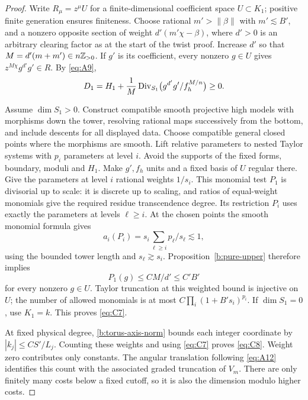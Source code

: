 \begin{proof}
Write \(R_\mu=z^\mu U\) for a finite-dimensional coefficient
space \(U\subset K_1\); positive finite generation ensures
finiteness. Choose rational \(m'>\|\beta\|\) with
\(m'\lesssim B'\), and a nonzero opposite section of weight
\(d'(m'\chi-\beta)\), where \(d'>0\) is an arbitrary
clearing factor as at the start of the twist proof.
Increase \(d'\) so that \(M=d'(m+m')\in n\mathbb Z_{>0}\).
If \(g'\) is its coefficient, every nonzero \(g\in U\) gives
\(z^{M\chi}g^{d'}g'\in R\). By \eqref{eq:A9},
\[
 D_1=H_1+\frac1M\operatorname{Div}_{S_1}
                    \bigl(g^{d'}g'/f_h^{M/n}\bigr)\ge0.
\]

Assume \(\dim S_1>0\). Construct compatible smooth projective
high models with morphisms down the tower, resolving rational
maps successively from the bottom, and include descents for
all displayed data. Choose compatible general closed points
where the morphisms are smooth. Lift relative parameters to
nested Taylor systems with \(p_i\) parameters at level \(i\).
Avoid the supports of the fixed forms, boundary, moduli and
\(H_1\). Make \(g',f_h\) units and a fixed basis of \(U\)
regular there. Give the parameters at level \(i\) rational
weights \(1/s_i\). This monomial test \(P_1\) is divisorial
up to scale: it is discrete up to scaling, and ratios of
equal-weight monomials give the required residue
transcendence degree. Its restriction \(P_i\) uses exactly
the parameters at levels \(\ell\ge i\).
At the chosen points the smooth monomial formula gives
\[
                  a_i(P_i)=s_i\sum_{\ell\ge i}p_\ell/s_\ell
                                      \lesssim1,
\]
using the bounded tower length and \(s_{\ell}\gtrsim s_i\).
Proposition~\ref{b:pure-upper} therefore implies
\[
                         P_1(g)\le CM/d'\le C'B'
\]
for every nonzero \(g\in U\).
Taylor truncation at this weighted bound is injective on \(U\);
the number of allowed monomials is at most
\(C\prod_i(1+B's_i)^{p_i}\).
If \(\dim S_1=0\), use \(K_1=k\). This proves \eqref{eq:C7}.

At fixed physical degree, \eqref{b:torus-axis-norm} bounds each
integer coordinate by \(|k_j|\le CS'/L_j\).
Counting these weights and using \eqref{eq:C7} proves
\eqref{eq:C8}. Weight zero contributes only constants.
The angular translation following \eqref{eq:A12} identifies
this count with the associated graded truncation of \(V_m\).
There are only finitely many costs below a fixed cutoff,
so it is also the dimension modulo higher costs.
\end{proof}

